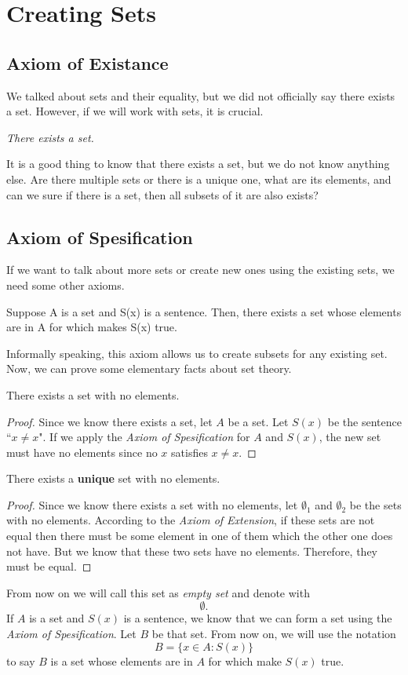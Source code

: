 \newpage{}
\section{Creating Sets}

\subsection{Axiom of Existance}
We talked about sets and their equality, but we did not officially say 
there exists a set. However, if we will work with sets, it is crucial.

\begin{center}
    \textit{There exists a set.}
\end{center}
It is a good thing to know that there exists a set, but we do not know 
anything else. Are there multiple sets or there is a unique one, what are 
its elements, and can we sure if there is a set, then all subsets of it are 
also exists?

\subsection{Axiom of Spesification}
If we want to talk about more sets or create new ones using the existing 
sets, we need some other axioms. 
\begin{axiom*}
    Suppose A is a set and S(x) is a sentence. Then, there exists a set 
    whose elements are in A for which makes S(x) true.
\end{axiom*}
Informally speaking, this axiom allows us to create subsets for any 
existing set. Now, we can prove some elementary facts about set theory.

\begin{theorem*} There exists a set with no elements.\end{theorem*}
\begin{proof}
    Since we know there exists a set, let $A$ be a set. Let $S(x)$ be the
    sentence ``$x \not = x$". If we apply the \textit{Axiom of Spesification}
    for $A$ and $S(x)$, the new set must have no elements since
    no $x$ satisfies $x \not= x$.
\end{proof}

\begin{theorem*} There exists a \textbf{unique} set with no elements. \end{theorem*}
\begin{proof}
    Since we know there exists a set with no elements, let $\emptyset_1$ and 
    $\emptyset_2$ be the sets with no elements. According to the 
    \textit{Axiom of Extension}, if these sets are not equal then there 
    must be some element in one of them which the other one does not have.
    But we know that these two sets have no elements. Therefore, they 
    must be equal.
\end{proof}
From now on we will call this set as \textit{empty set} and denote
with \[\emptyset.\]
If $A$ is a set and $S(x)$ is a sentence, we know that we can form a set 
using the \textit{Axiom of Spesification}. Let $B$ be that set.
From now on, we will use the notation \[B = \{x \in A : S(x)\}\]
to say $B$ is a set whose elements are in $A$ for which make $S(x)$ true.

